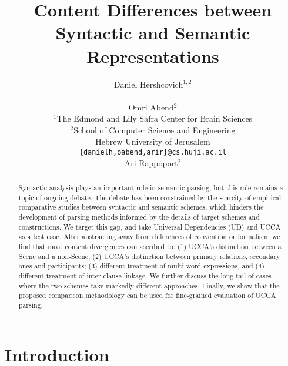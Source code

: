 \documentclass[11pt,a4paper]{article}
\title{Content Differences between Syntactic and Semantic Representations}
\author{Daniel Hershcovich$^{1,2}$ \\
  \\\And
  Omri Abend$^2$ \\
  $^1$The Edmond and Lily Safra Center for Brain Sciences \\
  $^2$School of Computer Science and Engineering \\
  Hebrew University of Jerusalem \\
  \texttt{\{danielh,oabend,arir\}@cs.huji.ac.il}
  \\\And
  Ari Rappoport$^2$
}
\date{}
\newcommand{\oa}[1]{\footnote{\color{red}OA: #1}}
\begin{document}
\maketitle

\begin{abstract}

  Syntactic analysis plays an important role in semantic parsing,
  but this role remains a topic of ongoing debate.
  The debate has been constrained by the scarcity of empirical comparative studies between syntactic and semantic schemes,
  which hinders the development of parsing methods informed by the details of target schemes and constructions.
  We target this gap, and take Universal Dependencies (UD) and UCCA as a test case.
  After abstracting away from differences of convention or formalism,
  we find that most content divergences can ascribed to: 
  (1) UCCA's distinction between a Scene and a non-Scene; %
  (2) UCCA's distinction between primary relations, secondary ones and participants; %
  (3) different treatment of multi-word expressions, and
  (4) different treatment of inter-clause linkage.
  We further discuss the long tail of cases where the two schemes take markedly
  different approaches.
  Finally, we show that the proposed comparison methodology can be used
  for fine-grained evaluation of UCCA parsing.
\end{abstract}



\section{Introduction}\label{sec:introduction}

  
\end{document}
